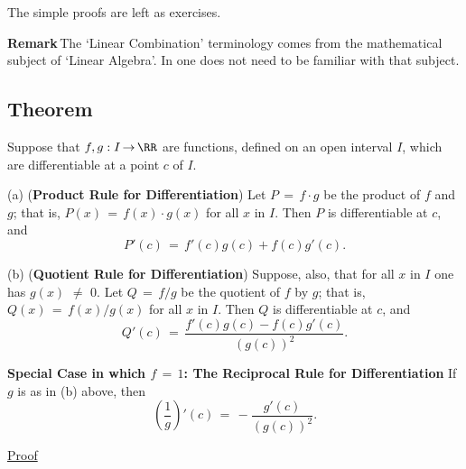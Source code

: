         The simple proofs are left as exercises.  \Q %

\V

        {\bf Remark}\,The `Linear Combination' terminology comes from the mathematical subject of `Linear Algebra'.
    In {\ThisText} one does not need to be familiar with that subject.

\VV

            \subsection{\small{\bf Theorem}}
            \label{ThmE30.40}

\V

        Suppose that $f,g:I \,{\rightarrow}\, {\RR}$ are functions, defined on an open interval $I$, which are differentiable at a point $c$ of $I$.

\V

        (a) ({\bf Product Rule for Differentiation})
    Let $P \,=\, f{\cdot}g$ be the product of $f$ and $g$; that is, $P(x) \,=\, f(x){\cdot}g(x)$ for all $x$ in $I$. Then $P$ is differentiable at $c$, and
        \begin{displaymath}
        P'(c) \,=\, f'(c)g(c) + f(c)g'(c).
        \end{displaymath}

\V


        (b) ({\bf Quotient Rule for Differentiation}) Suppose, also, that for all $x$ in $I$ one has $g(x) \,\,{\neq}\,\, 0$.
    Let $Q \,=\, f/g$ be the quotient of $f$ by $g$; that is, $Q(x) \,=\, f(x)/g(x)$ for all $x$ in $I$. Then $Q$ is differentiable at $c$, and
        \begin{displaymath}
        Q'(c) \,=\, \frac{f'(c)g(c)-f(c)g'(c)}{(g(c))^{2}}.
        \end{displaymath}

        {\bf Special Case in which $f \,=\, 1$: The Reciprocal Rule for Differentiation}
    If $g$ is as in (b) above, then
        \begin{displaymath}
        \left(\frac{1}{g}\right)'(c) \,=\, -\frac{g'(c)}{(g(c))^{2}}.
        \end{displaymath}

\V

        \underline{Proof}

